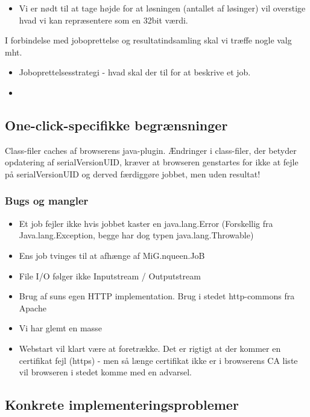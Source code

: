 \documentclass[draft,a4paper,10pt]{article}
\begin{document}
\begin{itemize}
\item{Vi er nødt til at tage højde for at løsningen (antallet af løsinger) vil overstige hvad vi kan repræsentere som en 32bit værdi. }
\end{itemize}

I forbindelse med joboprettelse og resultatindsamling skal vi træffe nogle valg mht.
\begin{itemize}
\item{Joboprettelsesstrategi - hvad skal der til for at beskrive et job.}
\item{}
\end{itemize}

\subsection{One-click-specifikke begrænsninger}

Class-filer caches af browserens java-plugin. Ændringer i class-filer, der betyder opdatering af serialVersionUID, kræver at browseren genstartes for ikke at fejle på serialVersionUID og derved færdiggøre jobbet, men uden resultat! 

\subsubsection{Bugs og mangler}
\begin{itemize}
	\item Et job fejler ikke hvis jobbet kaster en java.lang.Error (Forskellig fra Java.lang.Exception, begge har dog typen java.lang.Throwable)
	\item Ens job tvinges til at afhænge af MiG.nqueen.JoB
	\item File I/O følger ikke Inputstream / Outputstream	
	\item Brug af suns egen HTTP implementation. Brug i stedet http-commons fra Apache
	\item Vi har glemt en masse
	\item Webstart vil klart være at foretrække. Det er rigtigt at der kommer en certifikat fejl (https) - men så længe certifikat ikke er i browserens CA liste vil browseren i stedet komme med en advarsel.
\end{itemize}


\subsection{Konkrete implementeringsproblemer}
\end{document}
